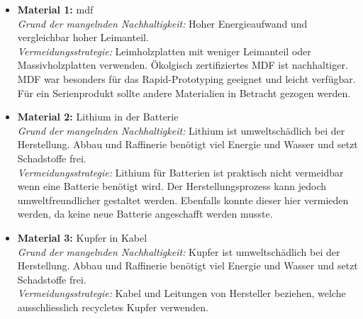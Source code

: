 \begin{itemize}
    \item \textbf{Material 1:} \acrfull{mdf} \\
          \textit{Grund der mangelnden Nachhaltigkeit:} Hoher Energieaufwand und vergleichbar hoher Leimanteil.\cite{support-2024}  \\
          \textit{Vermeidungsstrategie:} Leimholzplatten mit weniger Leimanteil oder Massivholzplatten verwenden. Ökolgisch zertifiziertes MDF ist nachhaltiger. MDF war besonders für das Rapid-Prototyping geeignet und leicht verfügbar. Für ein Serienprodukt sollte andere Materialien in Betracht gezogen werden.
          
    \item \textbf{Material 2:} Lithium in der Batterie \\
          \textit{Grund der mangelnden Nachhaltigkeit:} Lithium ist umweltschädlich bei der Herstellung. Abbau und Raffinerie benötigt viel Energie und Wasser und setzt Schadstoffe frei.\cite{litio-akkus} \\
          \textit{Vermeidungsstrategie:} Lithium für Batterien ist praktisch nicht vermeidbar wenn eine Batterie benötigt wird. Der Herstellungsprozess kann jedoch umweltfreundlicher gestaltet werden. Ebenfalls konnte dieser hier vermieden werden, da keine neue Batterie angeschafft werden musste.
          
    \item \textbf{Material 3:} Kupfer in Kabel \\
          \textit{Grund der mangelnden Nachhaltigkeit:} Kupfer ist umweltschädlich bei der Herstellung. Abbau und Raffinerie benötigt viel Energie und Wasser und setzt Schadstoffe frei. \\
          \textit{Vermeidungsstrategie:} Kabel und Leitungen von Hersteller beziehen, welche ausschliesslich recycletes Kupfer verwenden.
\end{itemize}

